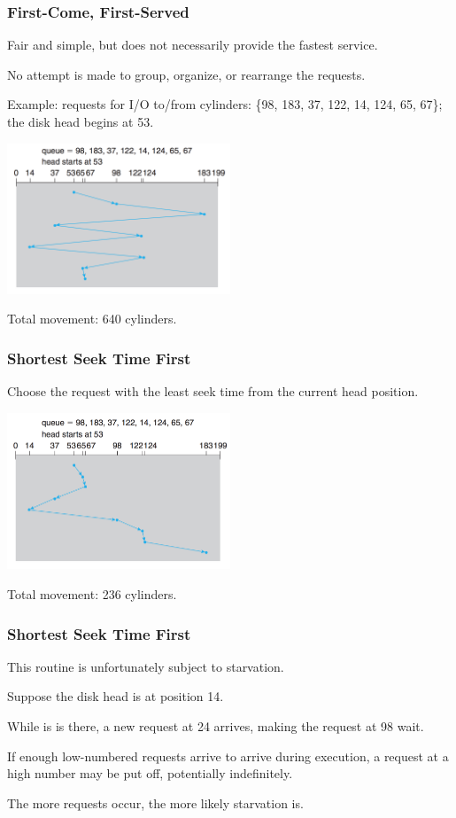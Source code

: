 \begin{frame}
\frametitle{First-Come, First-Served}

Fair and simple, but does not necessarily provide the fastest service.

No attempt is made to group, organize, or rearrange the requests.

Example: requests for I/O to/from cylinders: \{98, 183, 37, 122, 14, 124, 65, 67\}; the disk head begins at 53.

\begin{center}
	\includegraphics[width=0.5\textwidth]{images/disk-fcfs.png}
\end{center}

Total movement: 640 cylinders.

\end{frame}

\begin{frame}
\frametitle{Shortest Seek Time First}

Choose the request with the least seek time from the current head position.

\begin{center}
	\includegraphics[width=0.5\textwidth]{images/disk-sstf.png}
\end{center}

Total movement: 236 cylinders.

\end{frame}

\begin{frame}
\frametitle{Shortest Seek Time First}

This routine is unfortunately subject to starvation. 

Suppose the disk head is at position 14. 

While is is there, a new request at 24 arrives, making the request at 98 wait. 

If enough low-numbered requests arrive to arrive during execution, a request at a high number may be put off, potentially indefinitely. 

The more requests occur, the more likely starvation is.

\end{frame}

